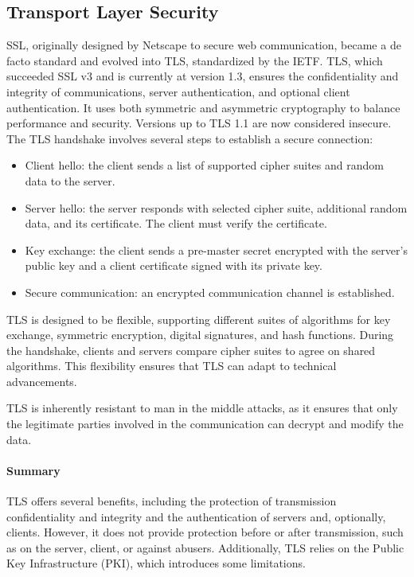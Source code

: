 \subsection{Transport Layer Security}
SSL, originally designed by Netscape to secure web communication, became a de facto standard and evolved into TLS, standardized by the IETF. 
TLS, which succeeded SSL v3 and is currently at version 1.3, ensures the confidentiality and integrity of communications, server authentication, and optional client authentication. 
It uses both symmetric and asymmetric cryptography to balance performance and security. Versions up to TLS 1.1 are now considered insecure.
The TLS handshake involves several steps to establish a secure connection:
\begin{itemize}
    \item Client hello: the client sends a list of supported cipher suites and random data to the server.
    \item Server hello: the server responds with selected cipher suite, additional random data, and its certificate. 
        The client must verify the certificate.
    \item Key exchange: the client sends a pre-master secret encrypted with the server's public key and a client certificate signed with its private key.
    \item Secure communication: an encrypted communication channel is established.
\end{itemize}
TLS is designed to be flexible, supporting different suites of algorithms for key exchange, symmetric encryption, digital signatures, and hash functions. 
During the handshake, clients and servers compare cipher suites to agree on shared algorithms. 
This flexibility ensures that TLS can adapt to technical advancements.

TLS is inherently resistant to man in the middle attacks, as it ensures that only the legitimate parties involved in the communication can decrypt and modify the data.

\paragraph*{Summary}
TLS offers several benefits, including the protection of transmission confidentiality and integrity and the authentication of servers and, optionally, clients. 
However, it does not provide protection before or after transmission, such as on the server, client, or against abusers. 
Additionally, TLS relies on the Public Key Infrastructure (PKI), which introduces some limitations.

